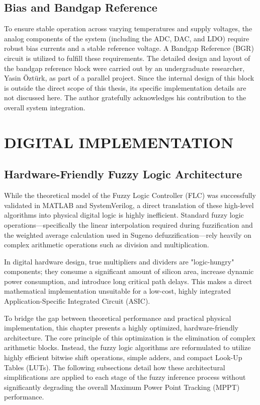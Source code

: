 \documentclass[a4paper,oneside,12pt]{report}
\numberwithin{equation}{chapter}
\begin{document}
\section{Bias and Bandgap Reference}
To ensure stable operation across varying temperatures and supply voltages, the analog components of the system (including the ADC, DAC, and LDO) require robust bias currents and a stable reference voltage. A Bandgap Reference (BGR) circuit is utilized to fulfill these requirements. The detailed design and layout of the bandgap reference block were carried out by an undergraduate researcher, Yasin Öztürk, as part of a parallel project. Since the internal design of this block is outside the direct scope of this thesis, its specific implementation details are not discussed here. The author gratefully acknowledges his contribution to the overall system integration.

\chapter{DIGITAL IMPLEMENTATION}\label{chapter:digital_impl}

\section{Hardware-Friendly Fuzzy Logic Architecture}
While the theoretical model of the Fuzzy Logic Controller (FLC) was successfully validated in MATLAB and SystemVerilog, a direct translation of these high-level algorithms into physical digital logic is highly inefficient. Standard fuzzy logic operations—specifically the linear interpolation required during fuzzification and the weighted average calculation used in Sugeno defuzzification—rely heavily on complex arithmetic operations such as division and multiplication. 

In digital hardware design, true multipliers and dividers are "logic-hungry" components; they consume a significant amount of silicon area, increase dynamic power consumption, and introduce long critical path delays. This makes a direct mathematical implementation unsuitable for a low-cost, highly integrated Application-Specific Integrated Circuit (ASIC).

To bridge the gap between theoretical performance and practical physical implementation, this chapter presents a highly optimized, hardware-friendly architecture. The core principle of this optimization is the elimination of complex arithmetic blocks. Instead, the fuzzy logic algorithms are reformulated to utilize highly efficient bitwise shift operations, simple adders, and compact Look-Up Tables (LUTs). The following subsections detail how these architectural simplifications are applied to each stage of the fuzzy inference process without significantly degrading the overall Maximum Power Point Tracking (MPPT) performance.
\end{document}
